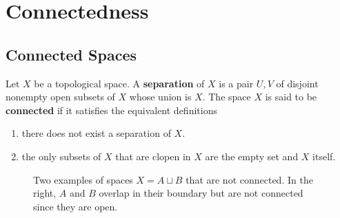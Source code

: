 \section{Connectedness} 

\subsection{Connected Spaces}

  \begin{definition}[Separation]
    Let $X$ be a topological space. A \textbf{separation} of $X$ is a pair $U, V$ of disjoint nonempty open subsets of $X$ whose union is $X$. The space $X$ is said to be \textbf{connected} if it satisfies the equivalent definitions 
    \begin{enumerate}
      \item there does not exist a separation of $X$. 
      \item the only subsets of $X$ that are clopen in $X$ are the empty set and $X$ itself. 
    \end{enumerate}

    \begin{figure}[H]
      \centering 
      \caption{Two examples of spaces $X = A \sqcup B$ that are not connected. In the right, $A$ and $B$ overlap in their boundary but are not connected since they are open. } 
      \label{fig:separation}
    \end{figure}
  \end{definition}

